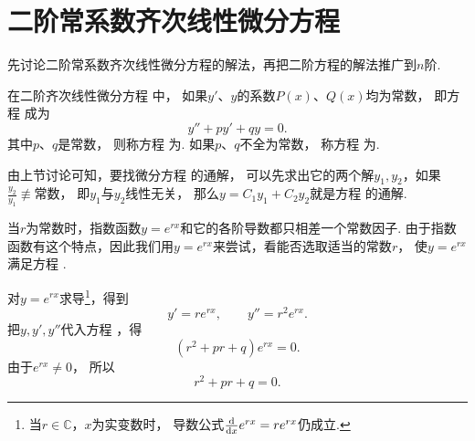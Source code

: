 \section{二阶常系数齐次线性微分方程}\label{section:微分方程.常系数齐次线性微分方程}
先讨论二阶常系数齐次线性微分方程的解法，再把二阶方程的解法推广到\(n\)阶.

\begin{definition}
在二阶齐次线性微分方程  中，
如果\(y'\)、\(y\)的系数\(P(x)\)、\(Q(x)\)均为常数，
即方程  成为
\begin{equation}\label{equation:微分方程.二阶常系数齐次线性微分方程的一般形式}
	y''+py'+qy=0.
\end{equation}
其中\(p\)、\(q\)是常数，
则称方程 
为.
如果\(p\)、\(q\)不全为常数，
称方程 
为.
\end{definition}

由上节讨论可知，要找微分方程  的通解，
可以先求出它的两个解\(y_1, y_2\)，如果\(\frac{y_2}{y_1} \not\equiv \text{常数}\)，
即\(y_1\)与\(y_2\)线性无关，
那么\(y = C_1 y_1 + C_2 y_2\)就是方程  的通解.

当\(r\)为常数时，指数函数\(y = e^{r x}\)和它的各阶导数都只相差一个常数因子.
由于指数函数有这个特点，因此我们用\(y = e^{rx}\)来尝试，看能否选取适当的常数\(r\)，
使\(y = e^{rx}\)满足方程 .

对\(y = e^{rx}\)求导\footnote{当\(r\in\mathbb{C}\)，\(x\)为实变数时，
导数公式\(\dv{x} e^{rx} = r e^{rx}\)仍成立.}，得到\begin{equation*}
	y' = r e^{rx}, \qquad y'' = r^2 e^{rx}.
\end{equation*}
把\(y,y',y''\)代入方程 ，得\begin{equation*}
	(r^2 + pr + q) e^{rx} = 0.
\end{equation*}
由于\(e^{rx}\neq0\)，
所以\begin{equation}\label{equation:微分方程.二阶常系数齐次线性微分方程的特征方程}
	r^2 + pr + q = 0.
\end{equation}

